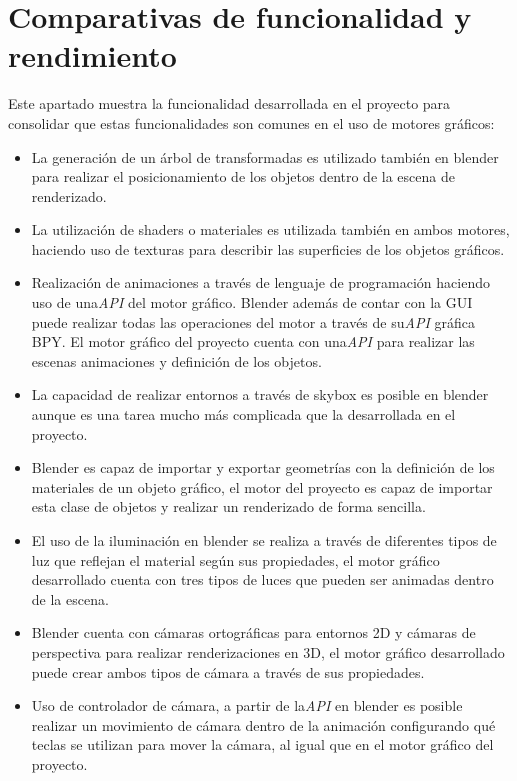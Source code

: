 \documentclass[a4paper]{book}
\begin{document}
\section{Comparativas de funcionalidad y rendimiento}
\label{sec:CompEngine}

Este apartado muestra la funcionalidad desarrollada en el proyecto para consolidar que estas funcionalidades son comunes en
el uso de motores gráficos:

\begin{itemize}
  \item La generación de un árbol de transformadas es utilizado también en blender para realizar el posicionamiento de
  los objetos dentro de la escena de renderizado.

  \item La utilización de shaders o materiales es utilizada también en ambos motores, haciendo uso de texturas para
  describir las superficies de los objetos gráficos.

  \item Realización de animaciones a través de lenguaje de programación haciendo uso de una\textit{API} del motor gráfico.
  Blender además de contar con la GUI puede realizar todas las operaciones del motor a través de su\textit{API} gráfica BPY.
  El motor gráfico del proyecto cuenta con una\textit{API} para realizar las escenas animaciones y definición de los objetos.

  \item La capacidad de realizar entornos a través de skybox es posible en blender aunque es una tarea mucho más
  complicada que la desarrollada en el proyecto.

  \item Blender es capaz de importar y exportar geometrías con la definición de los materiales de un objeto gráfico,
  el motor del proyecto es capaz de importar esta clase de objetos y realizar un renderizado de forma sencilla.

  \item El uso de la iluminación en blender se realiza a través de diferentes tipos de luz que reflejan el material
  según sus propiedades, el motor gráfico desarrollado cuenta con tres tipos de luces que pueden ser animadas dentro
  de la escena.

  \item Blender cuenta con cámaras ortográficas para entornos 2D y cámaras de perspectiva para realizar renderizaciones
   en 3D, el motor gráfico desarrollado puede crear ambos tipos de cámara a través de sus propiedades.

  \item Uso de controlador de cámara, a partir de la\textit{API} en blender es posible realizar un movimiento de cámara dentro
  de la animación configurando qué teclas se utilizan para mover la cámara, al igual que en el motor gráfico del proyecto.

\end{itemize}
\end{document}

